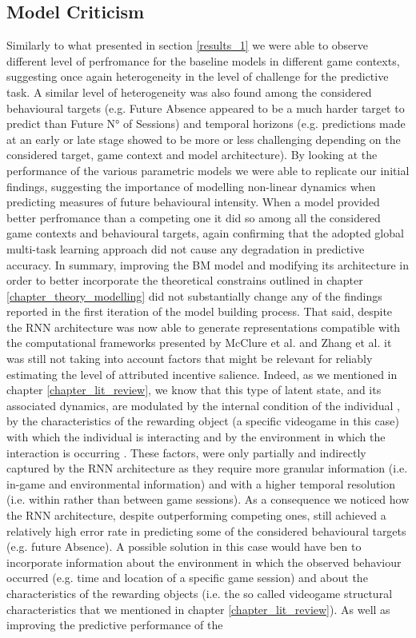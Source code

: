 \subsection{Model Criticism}
\label{model_criticims_2}
Similarly to what presented in section \ref{results_1} we were able to observe different level of perfromance for the baseline models in different game contexts, suggesting once again heterogeneity in the level of challenge for the predictive task. A similar level of heterogeneity was also found among the considered behavioural targets (e.g. Future Absence appeared to be a much harder target to predict than Future N° of Sessions) and temporal horizons (e.g. predictions made at an early or late stage showed to be more or less challenging depending on the considered target, game context and model architecture). By looking at the performance of the various parametric models we were able to replicate our initial findings, suggesting the importance of modelling non-linear dynamics when predicting measures of future behavioural intensity. When a model provided better perfromance than a competing one it did so among all the considered game contexts and behavioural targets, again confirming that the adopted global multi-task learning approach did not cause any degradation in predictive accuracy. In summary, improving the BM model and modifying its architecture in order to better incorporate the theoretical constrains outlined in chapter \ref{chapter_theory_modelling} did not substantially change any of the findings reported in the first iteration of the model building process. That said, despite the RNN architecture was now able to generate representations compatible with the computational frameworks presented by McClure et al. \cite{mcclure2003computational} and Zhang et al. \cite{zhang2009neural} it was still not taking into account factors that might be relevant for reliably estimating the level of attributed incentive salience. Indeed, as we mentioned in chapter \ref{chapter_lit_review}, we know that this type of latent state, and its associated dynamics, are modulated by the internal condition of the individual \cite{zhang2009neural}, by the characteristics of the rewarding object (a specific videogame in this case) with which the individual is interacting and by the environment in which the interaction is occurring \cite{palminteri2015contextual}. These factors, were only partially and indirectly captured by the RNN architecture as they require more granular information (i.e. in-game and environmental information) and with a higher temporal resolution (i.e. within rather than between game sessions). As a consequence we noticed how the RNN architecture, despite outperforming competing ones, still achieved a relatively high error rate in predicting some of the considered behavioural targets (e.g. future Absence). A possible solution in this case would have ben to incorporate information about the environment in which the observed behaviour occurred (e.g. time and location of a specific game session) and about the characteristics of the rewarding objects (i.e. the so called videogame structural characteristics that we mentioned in chapter \ref{chapter_lit_review}). As well as improving the predictive performance of the 